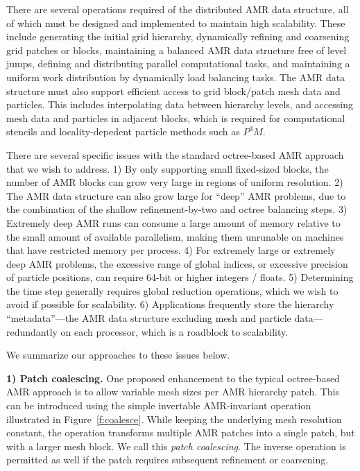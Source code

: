\documentclass[10pt,twocolumn]{article}
\begin{document}
There are several operations required of the distributed AMR data
structure, all of which must be designed and implemented to maintain
high scalability.  These include generating the initial grid
hierarchy, dynamically refining and coarsening grid patches or blocks,
maintaining a balanced AMR data structure free of level jumps,
defining and distributing parallel computational tasks, and
maintaining a uniform work distribution by dynamically load balancing
tasks.  The AMR data structure must also support efficient access to
grid block/patch mesh data and particles.  This includes interpolating
data between hierarchy levels, and accessing mesh data and particles
in adjacent blocks, which is required for computational stencils and
locality-depedent particle methods such as $P^3M$.

There are several specific issues with the standard octree-based AMR
approach that we wish to address.
%
1) By only supporting small fixed-sized blocks, the number of AMR blocks
can grow very large in regions of uniform resolution.
%
2) The AMR data structure can also grow large for ``deep'' AMR
problems, due to the combination of the shallow refinement-by-two and
octree balancing steps.
%
3) Extremely deep AMR runs can consume a large amount of memory
relative to the small amount of available parallelism, making them
unrunable on machines that have restricted memory per process.
%
4) For extremely large or extremely deep AMR problems, the excessive
range of global indices, or excessive precision of particle positions,
can require 64-bit or higher integers / floats.
%
5) Determining the time step generally requires global reduction
operations, which we wish to avoid if possible for scalability.
%
6) Applications frequently store the hierarchy ``metadata''---the AMR
data structure excluding mesh and particle data---redundantly on each
processor, which is a roadblock to scalability.

We summarize our approaches to these issues below.


\textbf{1) Patch coalescing.} One proposed enhancement to the typical
octree-based AMR approach is to allow variable mesh sizes per AMR
hierarchy patch.  This can be introduced using the simple invertable
AMR-invariant operation illustrated in Figure~\ref{f:coalesce}.  While
keeping the underlying mesh resolution constant, the operation
transforms multiple AMR patches into a single patch, but with a larger
mesh block.  We call this \textit{patch coalescing}.  The inverse
operation is permitted as well if the patch requires subsequent
refinement or coarsening.
\end{document}
